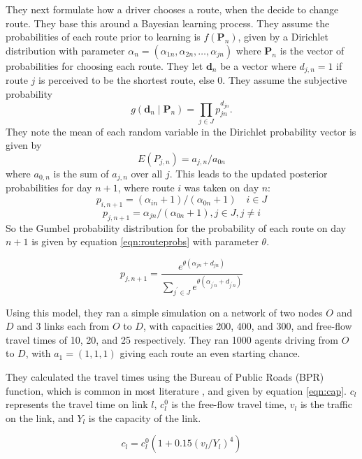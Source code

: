 \documentclass[12pt, a4paper, onecolumn]{article}
\begin{document}
They next formulate how a driver chooses a route, when the decide to change route. They base this around a Bayesian learning process. They assume the probabilities of each route prior to learning is $f(\textbf{P}_{n})$, given by a Dirichlet distribution with parameter $\alpha_{n}=\left(\alpha_{1 n}, \alpha_{2 n}, \ldots, \alpha_{j n}\right)$ where $\textbf{P}_{n}$ is the vector of probabilities for choosing each route. They let $\textbf{d}_{n}$ be a vector where $d_{j,n} = 1$ if route $j$ is perceived to be the shortest route, else $0$. They assume the subjective probability $$g\left(\mathbf{d}_{n} \mid \mathbf{P}_{n}\right)=\prod_{j \in J} p_{j n}^{d_{j n}}.$$ 
They note the mean of each random variable in the Dirichlet probability vector is given by 
$$E(P_{j,n}) = {a_{j,n}}/{a_{0n}}$$
where $a_{0,n}$ is the sum of $a_{j,n}$ over all $j$. This leads to the updated posterior probabilities for day $n+1$, where route $i$ was taken on day $n$:
$$
p_{i,n+1}=\left(\alpha_{i n}+1\right) /\left(\alpha_{0 n}+1\right) \quad i \in J
$$ $$
p_{j,n+1}=\alpha_{j n} /\left(\alpha_{0 n}+1\right), j \in J, j \neq i
$$
So the Gumbel probability distribution for the probability of each route on day $n+1$ is given by equation \ref{eqn:routeprobs} with parameter $\theta$.

\begin{equation}
	p_{j, n+1}=\frac{e^{\theta\left(\alpha_{j n}+d_{j n}\right)}}{\sum_{j^{\prime}  \in J} e^{\theta\left(\alpha_{j^{\prime} n}+d_{j^{\prime} n}\right)}}
	\label{eqn:routeprobs}
	\end{equation}

Using this model, they ran a simple simulation on a network of two nodes $O$ and $D$ and 3 links each from $O$ to $D$, with capacities 200, 400, and 300, and free-flow travel times of 10, 20, and 25 respectively. They ran 1000 agents driving from $O$ to $D$, with $a_1 = (1,1,1)$ giving each route an even starting chance. 

They calculated the travel times using the Bureau of Public Roads (BPR) function, which is common in most literature \citep{Manual1964} , and given by equation \ref{eqn:cap}. $c_{l}$ represents the travel time on link $l$, $c_{l}^{0}$ is the free-flow travel time, $v_{l}$ is the traffic on the link, and $Y_{l}$ is the capacity of the link.

\begin{equation}
	c_{l} = c_{l}^{0}( 1 + 0.15(v_{l}/Y_{l})^{4})
	\label{eqn:cap}
	\end{equation}
\end{document}
